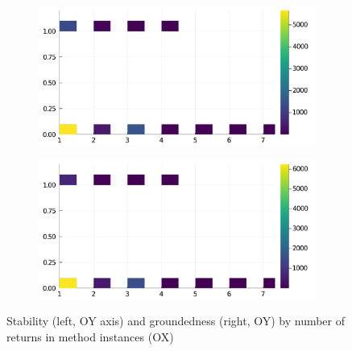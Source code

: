 \begin{figure}[h]
     \begin{subfigure}[b]{0.49\textwidth}
       \includegraphics[width=\textwidth]{figs/all-package-graphs/Knet-returns-vs-stable.pdf}
     \end{subfigure}
     \begin{subfigure}[b]{0.49\textwidth}
       \includegraphics[width=\textwidth]{figs/all-package-graphs/Knet-returns-vs-grounded.pdf}
     \end{subfigure}
\caption{Stability (left, OY axis) and groundedness (right, OY) by number of returns in method instances (OX)}%
%
\label{figs:returns:Knet}
\end{figure}
\clearpage
